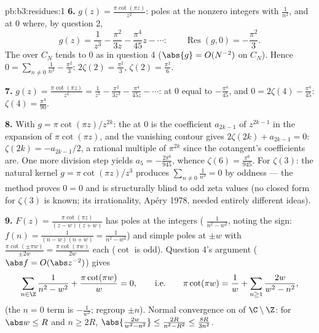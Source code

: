 \begin{solution}{pb:b3:residues:1}
\textbf{6.} $g(z) = \frac{\pi\cot(\pi z)}{z^2}$: poles at the
nonzero integers with  $\frac1{n^2}$, and at $0$
where, by question 2,
\[
g(z) = \frac1{z^3} - \frac{\pi^2}{3z} - \frac{\pi^4}{45}z -
\cdots :
\qquad \operatorname{Res}(g, 0) = -\frac{\pi^2}3 .
\]
The  over $C_N$ tends to $0$ as in question 4
($\abs{g} = O(N^{-2})$ on $C_N$). Hence $0 =
\sum_{n\neq0}\frac1{n^2} - \frac{\pi^2}3$: $2\zeta(2) =
\frac{\pi^2}3$, $\zeta(2) = \frac{\pi^2}6$.

\textbf{7.} $g(z) = \frac{\pi\cot(\pi z)}{z^4} = \frac1{z^5}
- \frac{\pi^2}{3z^3} - \frac{\pi^4}{45z} - \cdots$: 
at $0$ equal to $-\frac{\pi^4}{45}$, and $0 =
2\zeta(4) - \frac{\pi^4}{45}$: $\zeta(4) =
\frac{\pi^4}{90}$.

\textbf{8.} With $g = \pi\cot(\pi z)/z^{2k}$: the  at
$0$ is the coefficient $a_{2k-1}$ of $z^{2k-1}$ in the
expansion of $\pi\cot(\pi z)$, and the vanishing contour gives
$2\zeta(2k) + a_{2k-1} = 0$: $\zeta(2k) = -a_{2k-1}/2$, a
rational multiple of $\pi^{2k}$ since the cotangent's
coefficients are. One more division step yields $a_5 =
-\frac{2\pi^6}{945}$, whence $\zeta(6) = \frac{\pi^6}{945}$.
For $\zeta(3)$: the natural kernel $g = \pi\cot(\pi z)/z^3$
produces $\sum_{n\neq0}\frac1{n^3} = 0$ by oddness --- the
method proves $0 = 0$ and is structurally blind to odd zeta
values (no closed form for $\zeta(3)$ is known; its
irrationality, Ap\'ery 1978, needed entirely different
ideas).

\textbf{9.} $F(z) = \frac{\pi\cot(\pi z)}{(z - w)(z + w)}$
has poles at the integers ( $\frac1{n^2 - w^2}$,
noting the sign: $f(n) = \frac1{(n-w)(n+w)} = \frac1{n^2 -
w^2}$) and simple poles at $\pm w$ with 
$\frac{\pi\cot(\pm\pi w)}{\pm2w} = \frac{\pi\cot(\pi
w)}{2w}$ each ($\cot$ is odd). Question 4's argument
($\abs f = O(\abs z^{-2})$) gives
\[
\sum_{n\in\Z}\frac1{n^2 - w^2} + \frac{\pi\cot(\pi w)}{w} =
0,
\qquad\text{i.e.}\qquad
\pi\cot(\pi w) = \frac1w + \sum_{n\geq1}\frac{2w}{w^2 -
n^2},
\]
(the $n = 0$ term is $-\frac1{w^2}$; regroup $\pm n$). Normal
convergence on  of $\C\setminus\Z$: for $\abs w \leq
R$ and $n \geq 2R$, $\abs{\frac{2w}{w^2 - n^2}} \leq
\frac{2R}{n^2 - R^2} \leq \frac{8R}{3n^2}$.


\end{solution}
